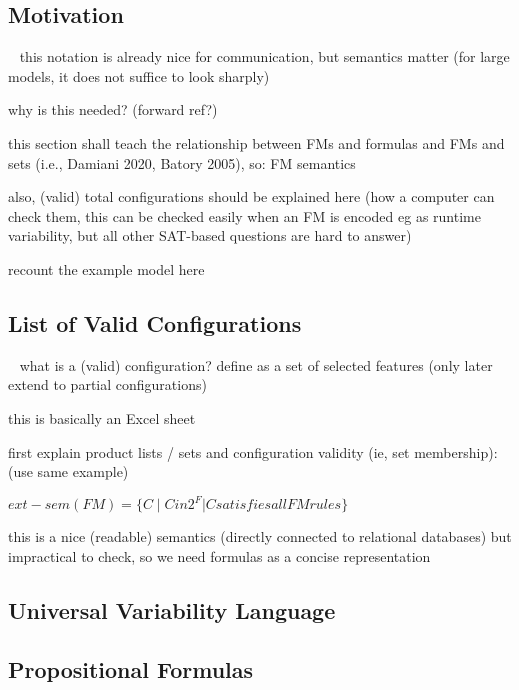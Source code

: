 \subsection{Motivation}

\begin{frame}{~}
    this notation is already nice for communication, but semantics matter (for large models, it does not suffice to look sharply)

    why is this needed? (forward ref?)

    this section shall teach the relationship between FMs and formulas and FMs and sets (i.e., Damiani 2020, Batory 2005), so: FM semantics

    also, (valid) total configurations should be explained here (how a computer can check them, this can be checked easily when an FM is encoded eg as runtime variability, but all other SAT-based questions are hard to answer)

    recount the example model here
\end{frame}

\subsection{List of Valid Configurations}

\begin{frame}{~}
    what is a (valid) configuration? define as a set of selected features (only later extend to partial configurations)

    this is basically an Excel sheet

    first explain product lists / sets and configuration validity (ie, set membership): (use same example)

    $ext-sem (FM) = \{ C \mid C in 2^F | C satisfies all FM rules \}$

    this is a nice (readable) semantics (directly connected to relational databases) but impractical to check, so we need formulas as a concise representation
\end{frame}

\subsection{Universal Variability Language}

\subsection{Propositional Formulas}

